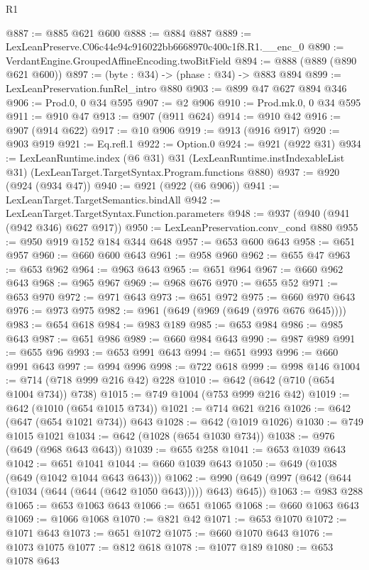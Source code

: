 \begin{lexlean}{R1}
\begin{coremodule}
@887 := @885 @621 @600
@888 := @884 @887
@889 := LexLeanPreserve.C06c44e94c916022bb6668970c400c1f8.R1.__enc_0
@890 := VerdantEngine.GroupedAffineEncoding.twoBitField
@894 := @888 (@889 (@890 @621 @600))
@897 := (byte : @34) -> (phase : @34) -> @883 @894
@899 := LexLeanPreservation.funRel_intro @880
@903 := @899 @47 @627 @894 @346
@906 := Prod.{0, 0} @34 @595
@907 := @2 @906
@910 := Prod.mk.{0, 0} @34 @595
@911 := @910 @47
@913 := @907 (@911 @624)
@914 := @910 @42
@916 := @907 (@914 @622)
@917 := @10 @906
@919 := @913 (@916 @917)
@920 := @903 @919
@921 := Eq.refl.{1}
@922 := Option.{0}
@924 := @921 (@922 @31)
@934 := LexLeanRuntime.index
    (@6 @31)
    @31
    (LexLeanRuntime.instIndexableList @31)
    (LexLeanTarget.TargetSyntax.Program.functions @880)
@937 := @920 (@924 (@934 @47))
@940 := @921 (@922 (@6 @906))
@941 := LexLeanTarget.TargetSemantics.bindAll
@942 := LexLeanTarget.TargetSyntax.Function.parameters
@948 := @937 (@940 (@941 (@942 @346) @627 @917))
@950 := LexLeanPreservation.conv_cond @880
@955 := @950 @919 @152 @184 @344 @648
@957 := @653 @600 @643
@958 := @651 @957
@960 := @660 @600 @643
@961 := @958 @960
@962 := @655 @47
@963 := @653 @962
@964 := @963 @643
@965 := @651 @964
@967 := @660 @962 @643
@968 := @965 @967
@969 := @968 @676
@970 := @655 @52
@971 := @653 @970
@972 := @971 @643
@973 := @651 @972
@975 := @660 @970 @643
@976 := @973 @975
@982 := @961 (@649 (@969 (@649 (@976 @676 @645))))
@983 := @654 @618
@984 := @983 @189
@985 := @653 @984
@986 := @985 @643
@987 := @651 @986
@989 := @660 @984 @643
@990 := @987 @989
@991 := @655 @96
@993 := @653 @991 @643
@994 := @651 @993
@996 := @660 @991 @643
@997 := @994 @996
@998 := @722 @618
@999 := @998 @146
@1004 := @714 (@718 @999 @216 @42) @228
@1010 := @642 (@642 (@710 (@654 @1004 @734)) @738)
@1015 := @749 @1004 (@753 @999 @216 @42)
@1019 := @642 (@1010 (@654 @1015 @734))
@1021 := @714 @621 @216
@1026 := @642 (@647 (@654 @1021 @734)) @643
@1028 := @642 (@1019 @1026)
@1030 := @749 @1015 @1021
@1034 := @642 (@1028 (@654 @1030 @734))
@1038 := @976 (@649 (@968 @643 @643))
@1039 := @655 @258
@1041 := @653 @1039 @643
@1042 := @651 @1041
@1044 := @660 @1039 @643
@1050 := @649 (@1038 (@649 (@1042 @1044 @643 @643)))
@1062 := @990 (@649 (@997 (@642 (@644 (@1034 (@644 (@644 (@642 @1050 @643))))) @643) @645))
@1063 := @983 @288
@1065 := @653 @1063 @643
@1066 := @651 @1065
@1068 := @660 @1063 @643
@1069 := @1066 @1068
@1070 := @821 @42
@1071 := @653 @1070
@1072 := @1071 @643
@1073 := @651 @1072
@1075 := @660 @1070 @643
@1076 := @1073 @1075
@1077 := @812 @618
@1078 := @1077 @189
@1080 := @653 @1078 @643

\end{coremodule}
\end{lexlean}
